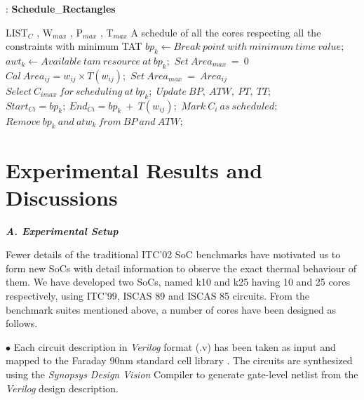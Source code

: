 \documentclass[conference]{IEEEtran}
\begin{document}
\renewcommand{\algorithmicrequire}{\textbf{Input:}}
	\renewcommand{\algorithmicensure}{\textbf{Output:}}
	\renewcommand{\labelenumi}{\Roman{enumi}}
    \begin{algorithm}[H]
    \caption{: \textbf{Schedule}\_\textbf{Rectangles}}
    \begin{algorithmic}[1]
    \Require LIST$_{C}$ , W$_{max}$ , P$_{max}$ , T$_{max}$
	\Ensure A schedule of all the cores respecting all the constraints with minimum TAT
	\Begin
    \State $bp_{k}\gets Break\  point\  with\  minimum\  time\  value;$
    \State $awt_{k}\gets Available\  tam\  resource\  at\  bp_{k} ;$
    \State $Set\ Area_{max}\ =\  0$
    \State $Cal\ Area_{ij} = w_{ij} \times T(w_{ij});$
    \EndIf
    \State $Set\ Area_{max}\ =\  Area_{ij}$
    \EndIf
    \EndIf
    \EndIf
    \State $Select\ C_{imax}\ for\ scheduling\ at\ bp_{k};$
    \State $Update\ BP,\ ATW,\ PT,\ TT;$
    \State $Start_{Ci} = bp_{k};\ End_{Ci} = bp_{k}\ +\ T(w_{ij});$
    \State $Mark\ C_{i}\ as\ scheduled;$
    \EndFor
    \State $Remove\ bp_{k}\ and\ atw_{k}\ from\ BP\ and\ ATW;$
    \EndWhile
    \EndWhile
    \End
    \end{algorithmic}
    \end{algorithm}

\section{Experimental Results and Discussions}
\label{sec: 4}

\textbf{\textit{A. Experimental Setup}}\\
\par
Fewer details of the traditional ITC’02 SoC benchmarks
have motivated us to form new SoCs with detail information
to observe the exact thermal behaviour of them. We have
developed two SoCs, named k10 and k25 having 10 and
25 cores respectively, using ITC’99, ISCAS 89 and ISCAS
85 circuits. From the benchmark suites mentioned above, a
number of cores have been designed as follows.

$\bullet$ Each circuit description in \textit{Verilog} format (.v) has been taken
as input and mapped to the Faraday 90nm standard cell library
\cite{karmakar2016thermal}. The circuits are synthesized using the \textit{Synopsys Design
Vision} Compiler \cite{lettnin2004synthesis} to generate gate-level netlist from the
\textit{Verilog} design description.
\end{document}
